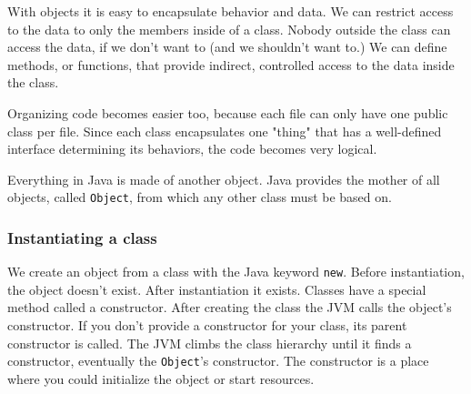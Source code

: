 With objects it is easy to encapsulate behavior and data. We can restrict access to the data to only the members inside of a class. Nobody outside the class can access the data, if we don't want to (and we shouldn't want to.) We can define methods, or functions, 	that provide indirect, controlled access to the data inside the class.

Organizing code becomes easier too, because each file can only have one  public class per file\cite{spec}. Since each class encapsulates one "thing" that has a well-defined interface determining its behaviors, the code becomes very logical.

Everything in Java is made of another object. Java provides the mother of all objects, called \texttt{Object}, from which any other class must be based on.

\subsubsection{Instantiating a class}
We create an object from a class with the Java keyword \texttt{new}. Before instantiation, the object doesn't exist. After instantiation it exists. Classes have a special method called a constructor. After creating the class the JVM calls the object's constructor. If you don't provide a constructor for your class, its parent constructor is called. The JVM climbs the class hierarchy until it finds  a constructor, eventually the \texttt{Object}'s constructor. The constructor is a place where you could initialize the object or start resources.\cite{nicholas}
